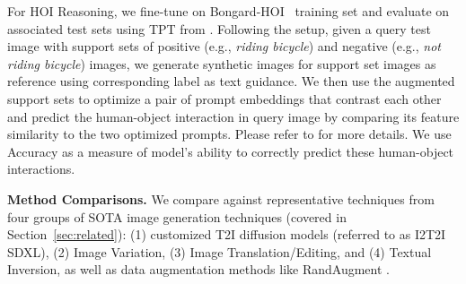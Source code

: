 For HOI Reasoning, we fine-tune \method on Bongard-HOI~\citep{jiang2022bongard} training set and evaluate on associated test sets using TPT from \citet{shu2022testtime}. Following the setup, given a query test image with support sets of positive (e.g., \textit{riding bicycle}) and negative (e.g., \textit{not riding bicycle}) images, we generate synthetic images for support set images as reference using corresponding label as text guidance. We then use the augmented support sets to optimize a pair of prompt embeddings that contrast each other and predict the human-object interaction in query image by comparing its feature similarity to the two optimized prompts. Please refer to \citet{shu2022testtime} for more details.
We use Accuracy as a measure of model's ability to correctly predict these human-object interactions.


\textbf{Method Comparisons.} We compare \method against representative techniques from four groups of SOTA image generation techniques (covered in Section~\ref{sec:related}): (1) customized T2I diffusion models (referred to as I2T2I SDXL), (2) Image Variation, (3) Image Translation/Editing, and (4) Textual Inversion, as well as data augmentation methods like RandAugment \citep{cubuk2020randaugment}.

